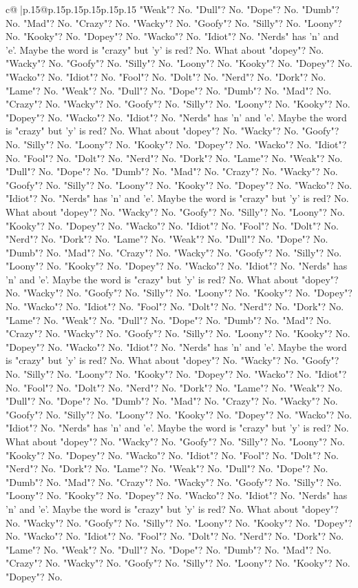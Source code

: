 \documentclass{article}
\begin{document}
{\begin{supertabular}{c@{$\;$}|p{.15\linewidth}@{}p{.15\linewidth}p{.15\linewidth}p{.15\linewidth}p{.15\linewidth}p{.15\linewidth}}
{{{"Weak"? No. "Dull"? No. "Dope"? No. "Dumb"? No. "Mad"? No. "Crazy"? No. "Wacky"? No. "Goofy"? No. "Silly"? No. "Loony"? No. "Kooky"? No. "Dopey"? No. "Wacko"? No. "Idiot"? No. "Nerds" has 'n' and 'e'. Maybe the word is "crazy" but 'y' is red? No. What about "dopey"? No. "Wacky"? No. "Goofy"? No. "Silly"? No. "Loony"? No. "Kooky"? No. "Dopey"? No. "Wacko"? No. "Idiot"? No. "Fool"? No. "Dolt"? No. "Nerd"? No. "Dork"? No. "Lame"? No. "Weak"? No. "Dull"? No. "Dope"? No. "Dumb"? No. "Mad"? No. "Crazy"? No. "Wacky"? No. "Goofy"? No. "Silly"? No. "Loony"? No. "Kooky"? No. "Dopey"? No. "Wacko"? No. "Idiot"? No. "Nerds" has 'n' and 'e'. Maybe the word is "crazy" but 'y' is red? No. What about "dopey"? No. "Wacky"? No. "Goofy"? No. "Silly"? No. "Loony"? No. "Kooky"? No. "Dopey"? No. "Wacko"? No. "Idiot"? No. "Fool"? No. "Dolt"? No. "Nerd"? No. "Dork"? No. "Lame"? No. "Weak"? No. "Dull"? No. "Dope"? No. "Dumb"? No. "Mad"? No. "Crazy"? No. "Wacky"? No. "Goofy"? No. "Silly"? No. "Loony"? No. "Kooky"? No. "Dopey"? No. "Wacko"? No. "Idiot"? No. "Nerds" has 'n' and 'e'. Maybe the word is "crazy" but 'y' is red? No. What about "dopey"? No. "Wacky"? No. "Goofy"? No. "Silly"? No. "Loony"? No. "Kooky"? No. "Dopey"? No. "Wacko"? No. "Idiot"? No. "Fool"? No. "Dolt"? No. "Nerd"? No. "Dork"? No. "Lame"? No. "Weak"? No. "Dull"? No. "Dope"? No. "Dumb"? No. "Mad"? No. "Crazy"? No. "Wacky"? No. "Goofy"? No. "Silly"? No. "Loony"? No. "Kooky"? No. "Dopey"? No. "Wacko"? No. "Idiot"? No. "Nerds" has 'n' and 'e'. Maybe the word is "crazy" but 'y' is red? No. What about "dopey"? No. "Wacky"? No. "Goofy"? No. "Silly"? No. "Loony"? No. "Kooky"? No. "Dopey"? No. "Wacko"? No. "Idiot"? No. "Fool"? No. "Dolt"? No. "Nerd"? No. "Dork"? No. "Lame"? No. "Weak"? No. "Dull"? No. "Dope"? No. "Dumb"? No. "Mad"? No. "Crazy"? No. "Wacky"? No. "Goofy"? No. "Silly"? No. "Loony"? No. "Kooky"? No. "Dopey"? No. "Wacko"? No. "Idiot"? No. "Nerds" has 'n' and 'e'. Maybe the word is "crazy" but 'y' is red? No. What about "dopey"? No. "Wacky"? No. "Goofy"? No. "Silly"? No. "Loony"? No. "Kooky"? No. "Dopey"? No. "Wacko"? No. "Idiot"? No. "Fool"? No. "Dolt"? No. "Nerd"? No. "Dork"? No. "Lame"? No. "Weak"? No. "Dull"? No. "Dope"? No. "Dumb"? No. "Mad"? No. "Crazy"? No. "Wacky"? No. "Goofy"? No. "Silly"? No. "Loony"? No. "Kooky"? No. "Dopey"? No. "Wacko"? No. "Idiot"? No. "Nerds" has 'n' and 'e'. Maybe the word is "crazy" but 'y' is red? No. What about "dopey"? No. "Wacky"? No. "Goofy"? No. "Silly"? No. "Loony"? No. "Kooky"? No. "Dopey"? No. "Wacko"? No. "Idiot"? No. "Fool"? No. "Dolt"? No. "Nerd"? No. "Dork"? No. "Lame"? No. "Weak"? No. "Dull"? No. "Dope"? No. "Dumb"? No. "Mad"? No. "Crazy"? No. "Wacky"? No. "Goofy"? No. "Silly"? No. "Loony"? No. "Kooky"? No. "Dopey"? No. "Wacko"? No. "Idiot"? No. "Nerds" has 'n' and 'e'. Maybe the word is "crazy" but 'y' is red? No. What about "dopey"? No. "Wacky"? No. "Goofy"? No. "Silly"? No. "Loony"? No. "Kooky"? No. "Dopey"? No. "Wacko"? No. "Idiot"? No. "Fool"? No. "Dolt"? No. "Nerd"? No. "Dork"? No. "Lame"? No. "Weak"? No. "Dull"? No. "Dope"? No. "Dumb"? No. "Mad"? No. "Crazy"? No. "Wacky"? No. "Goofy"? No. "Silly"? No. "Loony"? No. "Kooky"? No. "Dopey"? No. }}}
\end{supertabular}}
\end{document}
